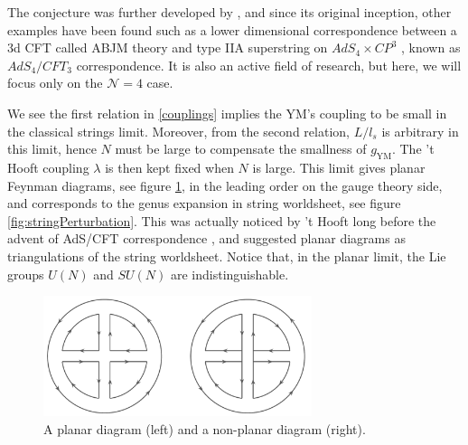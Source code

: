 The conjecture was further developed by \cite{Gubser:1998bc, Witten:1998qj},
and since its original inception, other examples have been found such as
a lower dimensional correspondence between a 3d CFT called ABJM theory 
and type IIA superstring on $AdS_4 \times CP^3$ \cite{Aharony:2008ug}, known as $AdS_4/CFT_3$ correspondence.
It is also an active field of research, but here, we will focus only on the $\mathcal{N}= 4$ case.



We see the first relation in \eqref{couplings} implies the YM's coupling to be small in the classical strings limit.
Moreover, from the second relation, $L/l_s $ is arbitrary in this limit, 
hence $N$ must be large to compensate the smallness of $g_\text{YM}$.
The 't Hooft coupling $\lambda $ is then kept fixed when $N$ is large.
This limit gives planar Feynman diagrams, see figure \ref{fig:planarNonPlanar}, in the leading order on the gauge theory side, 
and corresponds to the genus expansion in string worldsheet, see figure \ref{fig:stringPerturbation}.
This was actually noticed by 't Hooft long before the advent of AdS/CFT correspondence \cite{tHooft:1973alw},
and suggested planar diagrams as triangulations of the string worldsheet.
Notice that, in the planar limit, the Lie groups $U(N)$ and $SU(N)$ are indistinguishable.

\begin{figure}[t]
\begin{center}
\includegraphics[width=0.7\textwidth]{Images/planarNonPlanar.pdf}
\end{center}
\caption{\label{fig:planarNonPlanar} A planar diagram (left) and a non-planar diagram (right).}
\end{figure}


